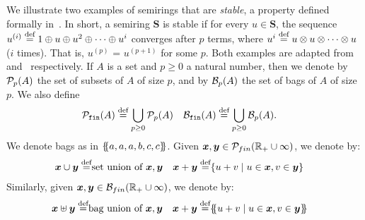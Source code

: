 We illustrate two examples of semirings that are {\em stable}, a
property defined formally in~\cite{DBLP:conf/pods/Khamis0PSW22}.  
In short, a semiring $\bm S$ is stable if for every $u \in \bm S$, 
 the sequence $u^{(i)} \stackrel{\text{def}}{=} 1 \oplus u \oplus u^2 \oplus \cdots \oplus u^i$ converges after $p$ terms, 
 where $u^i \stackrel{\text{def}}{=} u \otimes u \otimes \cdots \otimes u$ ($i$ times).
That is, $u^{(p)}$ = $u^{(p+1)}$ for some $p$.
Both examples are adapted from~\cite[Example 7.1.4]{semiring_book}
and~\cite[Chapt.8, Sec.1.3.2]{semiring_book} respectively.  If $A$ is
a set and $p \geq 0$ a natural number, then we denote by $\mathcal P_p(A)$
the set of subsets of $A$ of size $p$, and by $\mathcal B_p(A)$ the set of
bags of $A$ of size $p$.  We also define
\begin{align*}
    \mathcal P_{\texttt{fin}}(A) &\stackrel{\text{def}}{=} \bigcup_{p\geq 0}\mathcal P_p(A) &
    \mathcal B_{\texttt{fin}}(A) & \stackrel{\text{def}}{=} \bigcup_{p\geq 0}\mathcal B_p(A).
     &
\end{align*}
We denote bags as in $\{\hspace{-1mm}\{a,a,a,b,c,c\}\hspace{-1mm}\}$.  Given
$\bm x,\bm y \in \mathcal P_{fin}(\mathbb R_+ \cup \infty)$, we denote by:
%
\begin{align*}
  \bm x \cup \bm y \stackrel{\text{def}}{=} & \mbox{set union of $\bm x,\bm y$} &
  \bm x + \bm y \stackrel{\text{def}}{=} & \{{u+v}\mid{u \in \bm x, v \in \bm y}\}
\end{align*}
%
Similarly, given $\bm x,\bm y \in \mathcal B_{fin}(\mathbb R_+ \cup \infty)$, we denote
by:
%
\begin{align*}
  \bm x \uplus \bm y \stackrel{\text{def}}{=} & \mbox{bag union of $\bm x,\bm y$} &
  \bm x + \bm y \stackrel{\text{def}}{=} & \{\hspace{-1mm}\{{u+v}\mid{u \in \bm x, v \in \bm y}\}\hspace{-1mm}\}
\end{align*}


